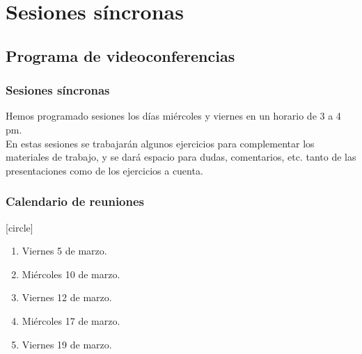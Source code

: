 \documentclass[12pt]{beamer}
\begin{document}
\section{Sesiones síncronas}

\subsection{Programa de videoconferencias}

\begin{frame}
\frametitle{Sesiones síncronas}
Hemos programado sesiones los días miércoles y viernes en un horario de 3 a 4 pm.
\\
\bigskip
\pause
En estas sesiones se trabajarán algunos ejercicios para complementar los materiales de trabajo, y se dará espacio para dudas, comentarios, etc. tanto de las presentaciones como de los ejercicios a cuenta.
\end{frame}
\begin{frame}
\frametitle{Calendario de reuniones}
[circle]
\begin{enumerate}[<+->]
\item Viernes 5 de marzo.
\item Miércoles 10 de marzo.
\item Viernes 12 de marzo.
\item Miércoles 17 de marzo.
\item Viernes 19 de marzo. 
\end{enumerate}
\end{frame}
\end{document}
